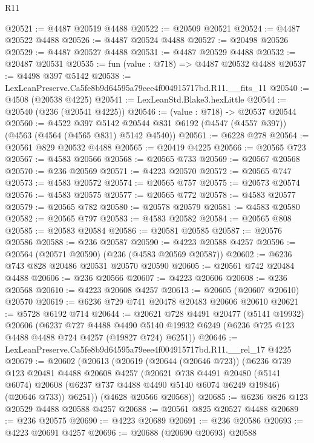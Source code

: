 \begin{lexlean}{R11}
\begin{coremodule}
@20521 := @4487 @20519 @4488
@20522 := @20509 @20521
@20524 := @4487 @20522 @4488
@20526 := @4487 @20524 @4488
@20527 := @20498 @20526
@20529 := @4487 @20527 @4488
@20531 := @4487 @20529 @4488
@20532 := @20487 @20531
@20535 := fun (value : @718) => @4487 @20532 @4488
@20537 := @4498 @397 @5142
@20538 := LexLeanPreserve.Ca5fe8b9d64595a79eee4f004915717bd.R11.__fits_11
@20540 := @4508 (@20538 @4225)
@20541 := LexLeanStd.Blake3.hexLittle
@20544 := @20540 (@236 (@20541 @4225))
@20546 := (value : @718) -> @20537 @20544
@20560 := @4522
    @397
    @5142
    @20544
    @831
    @6192
    (@4547 (@4557 @397))
    (@4563 (@4564 (@4565 @831) @5142 @4540))
@20561 := @6228 @278
@20564 := @20561 @829 @20532 @4488
@20565 := @20419 @4225
@20566 := @20565 @723
@20567 := @4583 @20566
@20568 := @20565 @733
@20569 := @20567 @20568
@20570 := @236 @20569
@20571 := @4223 @20570
@20572 := @20565 @747
@20573 := @4583 @20572
@20574 := @20565 @757
@20575 := @20573 @20574
@20576 := @4583 @20575
@20577 := @20565 @772
@20578 := @4583 @20577
@20579 := @20565 @782
@20580 := @20578 @20579
@20581 := @4583 @20580
@20582 := @20565 @797
@20583 := @4583 @20582
@20584 := @20565 @808
@20585 := @20583 @20584
@20586 := @20581 @20585
@20587 := @20576 @20586
@20588 := @236 @20587
@20590 := @4223 @20588 @4257
@20596 := @20564 (@20571 @20590) (@236 (@4583 @20569 @20587))
@20602 := @6236 @743 @828 @20486 @20531 @20570 @20590
@20605 := @20561 @742 @20484 @4488
@20606 := @236 @20566
@20607 := @4223 @20606
@20608 := @236 @20568
@20610 := @4223 @20608 @4257
@20613 := @20605 (@20607 @20610) @20570
@20619 := @6236 @729 @741 @20478 @20483 @20606 @20610
@20621 := @5728 @6192 @714
@20644 := @20621
    @728
    @4491
    @20477
    (@5141 @19932)
    @20606
    (@6237
      @727
      @4488
      @4490
      @5140
      @19932
      @6249
      (@6236 @725 @123 @4488 @4488 @724 @4257 (@19827 @724) @6251))
@20646 := LexLeanPreserve.Ca5fe8b9d64595a79eee4f004915717bd.R11.__rel_17 @4225
@20679 := @20602
    (@20613
      (@20619
        (@20644 (@20646 @723))
        (@6236
          @739
          @123
          @20481
          @4488
          @20608
          @4257
          (@20621
            @738
            @4491
            @20480
            (@5141 @6074)
            @20608
            (@6237 @737 @4488 @4490 @5140 @6074 @6249 @19846)
            (@20646 @733))
          @6251))
      (@4628 @20566 @20568))
@20685 := @6236 @826 @123 @20529 @4488 @20588 @4257
@20688 := @20561 @825 @20527 @4488
@20689 := @236 @20575
@20690 := @4223 @20689
@20691 := @236 @20586
@20693 := @4223 @20691 @4257
@20696 := @20688 (@20690 @20693) @20588

\end{coremodule}
\end{lexlean}

